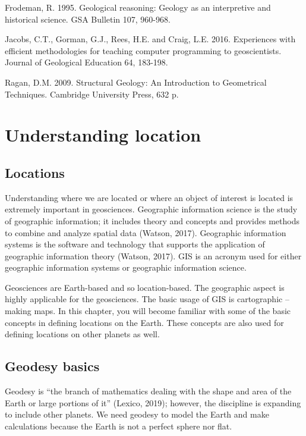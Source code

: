 \documentclass[a4paper , 12pt]{book}
\begin{document}
Frodeman, R. 1995. Geological reasoning: Geology as an interpretive and historical science. GSA Bulletin 107, 960-968.

Jacobs, C.T., Gorman, G.J., Rees, H.E. and Craig, L.E. 2016. Experiences with efficient methodologies for teaching computer programming to geoscientists. Journal of Geological Education 64, 183-198.

Ragan, D.M. 2009. Structural Geology: An Introduction to Geometrical Techniques. Cambridge University Press, 632 p.

\chapter{Understanding location}

\section{Locations}

Understanding where we are located or where an object of interest is located is extremely important in geosciences. Geographic information science is the study of geographic information; it includes theory and concepts and provides methods to combine and analyze spatial data (Watson, 2017). Geographic information systems is the software and technology that supports the application of geographic information theory (Watson, 2017). GIS is an acronym used for either geographic information systems or geographic information science. 

Geosciences are Earth-based and so location-based. The geographic aspect is highly applicable for the geosciences. The basic usage of GIS is cartographic – making maps. In this chapter, you will become familiar with some of the basic concepts in defining locations on the Earth. These concepts are also used for defining locations on other planets as well.

\section{Geodesy basics}

Geodesy is “the branch of mathematics dealing with the shape and area of the Earth or large portions of it” (Lexico, 2019); however, the discipline is expanding to include other planets. We need geodesy to model the Earth and make calculations because the Earth is not a perfect sphere nor flat.
\end{document}
